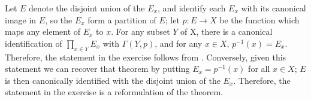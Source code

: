 \documentclass{article}
\begin{document}
\begin{solution}[\ref{exe:oh59gz4i}]
  \label{sol:h64ep1j0}
  Let \(E\) denote the disjoint union of the \(E_x\), and identify
  each \(E_x\) with its canonical image in \(E\), so the \(E_x\) form
  a partition of \(E\); let \(p : E \to X\) be the function which maps
  any element of \(E_x\) to \(x\).  For any subset \(Y\) of X, there
  is a canonical identification of \(\prod_{x \in Y} E_x\) with
  \(\Gamma(Y,p)\), and for any \(x \in X\), \(p^{-1}(x) = E_x\).
  Therefore, the statement in the exercise follows from
  .  Conversely, given this statement we can
  recover that theorem by putting \(E_x = p^{-1}(x)\) for all
  \(x \in X\); \(E\) is then canonically identified with the disjoint
  union of the \(E_x\).  Therefore, the statement in the exercise is a
  reformulation of the theorem.
\end{solution}
\end{document}
